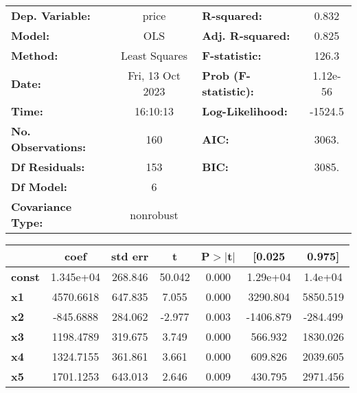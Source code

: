 \begin{center}
\begin{tabular}{lclc}
\toprule
\textbf{Dep. Variable:}    &      price       & \textbf{  R-squared:         } &     0.832   \\
\textbf{Model:}            &       OLS        & \textbf{  Adj. R-squared:    } &     0.825   \\
\textbf{Method:}           &  Least Squares   & \textbf{  F-statistic:       } &     126.3   \\
\textbf{Date:}             & Fri, 13 Oct 2023 & \textbf{  Prob (F-statistic):} &  1.12e-56   \\
\textbf{Time:}             &     16:10:13     & \textbf{  Log-Likelihood:    } &   -1524.5   \\
\textbf{No. Observations:} &         160      & \textbf{  AIC:               } &     3063.   \\
\textbf{Df Residuals:}     &         153      & \textbf{  BIC:               } &     3085.   \\
\textbf{Df Model:}         &           6      & \textbf{                     } &             \\
\textbf{Covariance Type:}  &    nonrobust     & \textbf{                     } &             \\
\bottomrule
\end{tabular}
\begin{tabular}{lcccccc}
               & \textbf{coef} & \textbf{std err} & \textbf{t} & \textbf{P$> |$t$|$} & \textbf{[0.025} & \textbf{0.975]}  \\
\midrule
\textbf{const} &    1.345e+04  &      268.846     &    50.042  &         0.000        &     1.29e+04    &      1.4e+04     \\
\textbf{x1}    &    4570.6618  &      647.835     &     7.055  &         0.000        &     3290.804    &     5850.519     \\
\textbf{x2}    &    -845.6888  &      284.062     &    -2.977  &         0.003        &    -1406.879    &     -284.499     \\
\textbf{x3}    &    1198.4789  &      319.675     &     3.749  &         0.000        &      566.932    &     1830.026     \\
\textbf{x4}    &    1324.7155  &      361.861     &     3.661  &         0.000        &      609.826    &     2039.605     \\
\textbf{x5}    &    1701.1253  &      643.013     &     2.646  &         0.009        &      430.795    &     2971.456     \\

\end{tabular}
\end{center}
